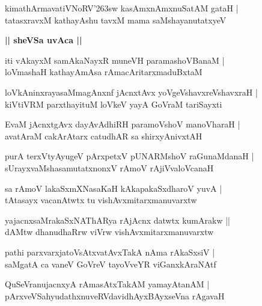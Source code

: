 \documentclass[twoside,12pt,openright]{book}
\def\S{\char'263}
\newcounter{shloka}[chapter]
\def\uvaca#1{\centerline{{\large\textbf{#1}}}}
\begin{document}
\begin{shloka}%
kimathArmavatiVNoRV\S sw kasAmxnAmxnuSatAM gataH |\\
tatasxravxM kathayAshu tavxM mama saMshayanutatxyeV 
\end{shloka}

\uvaca{|| sheVSa uvAca ||}

\begin{shloka}%
iti vAkayxM samAkaNayxR muneVH paramashoVBanaM |\\
loVmashaH kathayAmAsa rAmacAritarxmaduBxtaM 
\end{shloka}

\begin{shloka}%
loVkAninxrayasaMmagAnxnf jAcnxtAvx yoVgeVshavxreVshavxraH |\\
kiVtiVRM parxthayituM loVkeV yayA GoVraM tariSayxti 
\end{shloka}

\begin{shloka}%
EvaM jAcnxtgAvx dayAvAdhiRH paramoVshoV manoVharaH |\\
avatAraM cakArAtarx catudhAR sa shirxyAnivxtAH 
\end{shloka}

\begin{shloka}%
purA terxVtyAyugeV pArxpetxV pUNARMshoV raGunaMdanaH |\\
sUrayxvaMshasamutatxnonxV rAmoV rAjiVvaloVcanaH 
\end{shloka}

\begin{shloka}%
sa rAmoV lakaSxmXNasaKaH kAkapakaSxdharoV yuvA |\\
tAtasayx vacanAtwtx tu vishAvxmitarxmanuvarxtw
\end{shloka}

\begin{shloka}%
yajacnxsaMrakaSxNAThARya rAjAcnx datwtx kumArakw ||\\
dAMtw dhanudhaRrw viVrw vishAvxmitarxmanuvarxtw
\end{shloka}

\begin{shloka}%
pathi parxvarxjatoVsAtxvatAvxTakA nAma rAkaSxsiV |\\
saMgatA ca vaneV GoVreV tayoVveYR viGanxkAraNAtf
\end{shloka}

\begin{shloka}%
QuSeVranujacnxyA rAmasAtxTakAM yamayAtanAM |\\
pArxveVSahyudathxnuveRVdavidhAyxBAyxseVna rAgavaH 
\end{shloka}
\end{document}
